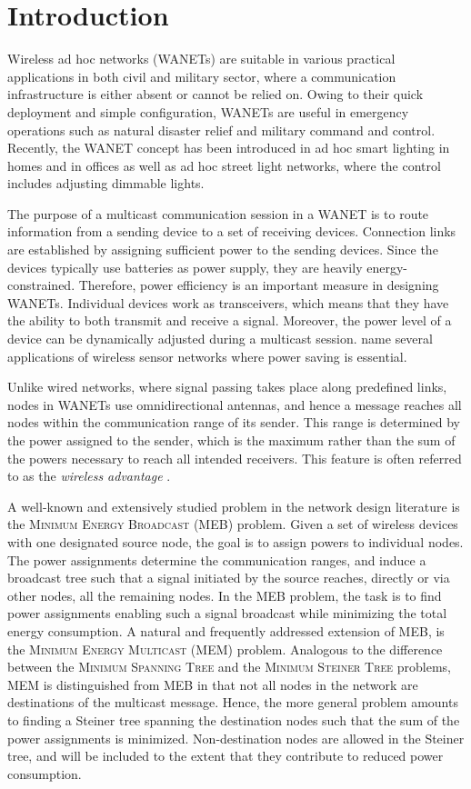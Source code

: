 \section{Introduction}
\label{intro}

Wireless ad hoc networks (WANETs) are suitable in various practical applications in both civil and military sector, where a communication infrastructure is either absent or cannot be relied on.
Owing to their quick deployment and simple configuration, WANETs are useful in emergency operations such as natural disaster relief and military command and control.
Recently, the WANET concept has been introduced in ad hoc smart lighting in homes and in offices as well as ad hoc street light networks, where the control includes adjusting dimmable lights.
 
The purpose of a multicast communication session in a WANET is to route information from a sending device to a set of receiving devices.
Connection links are established by assigning sufficient power to the sending devices.
Since the devices typically use batteries as power supply, they are heavily energy-constrained.
Therefore, power efficiency is an important measure in designing WANETs.
Individual devices work as transceivers, which means that they have the ability to both transmit and receive a signal.
Moreover, the power level of a device can be dynamically adjusted during a multicast session.
\citet{montemanni11} name several applications of wireless sensor networks where power saving is essential.

Unlike wired networks, where signal passing takes place along predefined links, nodes in WANETs use omnidirectional antennas, and hence a message reaches all nodes within the communication range of its sender.
This range is determined by the power assigned to the sender, which is the maximum rather than the sum of the powers necessary to reach all intended receivers.
This feature is often referred to as the \emph{wireless advantage} \citep{Wieseltier00onthe}.

A well-known and extensively studied problem in the network design literature is the \textsc{Minimum Energy Broadcast} (MEB) problem.
Given a set of wireless devices with one designated source node, the goal is to assign powers to individual nodes.
The power assignments determine the communication ranges, and induce a broadcast tree such that a signal initiated by the source reaches, directly or via other nodes,
all the remaining nodes.
In the MEB problem, the task is to find power assignments enabling such a signal broadcast while minimizing the total energy consumption.
A natural and frequently addressed extension of MEB, is the \textsc{Minimum Energy Multicast} (MEM) problem.
Analogous to the difference between the \textsc{Minimum Spanning Tree} and the \textsc{Minimum Steiner Tree} problems,
MEM is distinguished from MEB in that not all nodes in the network are destinations of the multicast message.
Hence, the more general problem amounts to finding a Steiner tree spanning the destination nodes such that the sum of the power assignments is minimized.
Non-destination nodes are allowed in the Steiner tree, and will be included to the extent that they contribute to reduced power consumption.

